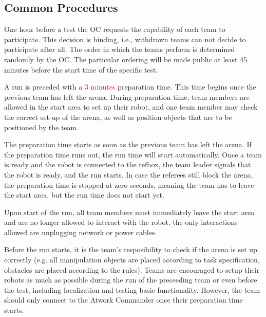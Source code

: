 \subsection{Common Procedures}
One hour before a test the OC requests the capability of each team to participate.
This decision is binding, i.e., withdrawn teams can not decide to participate after all.
The order in which the teams perform is determined randomly by the OC.
The particular ordering will be made public at least 45 minutes before the start time of the specific test.

\par
A run is preceded with a \textcolor{red}{3 minutes} preparation time. This time begins once the previous team has left the arena.
During preparation time, team members are allowed in the start area to set up their robot, and one team member may check the correct set-up of the arena, as well as position objects that are to be positioned by the team. %
\par
The preparation time starts as soon as the previous team has left the arena. If the preparation time runs out, the run time will start automatically.
Once a team is ready and the robot is connected to the refbox, the team leader signals that the robot is ready, and the run starts.
In case the referees still block the arena, the preparation time is stopped at zero seconds, meaning the team has to leave the start area, but the run time does not start yet.
\par
Upon start of the run, all team members must immediately leave the start area and are no longer allowed to interact with the robot, the only interactions allowed are unplugging network or power cables.
\par
Before the run starts, it is the team's resposibility to check if the arena is set up correctly (e.g. all manipulation objects are placed according to task specification, obstacles are placed according to the rules).
Teams are encouraged to setup their robots as much as possible during the run of the preceeding team or even before the test, including localization and testing basic functionality. However, the team should only connect to the Atwork Commander once their preparation time starts.
\par

